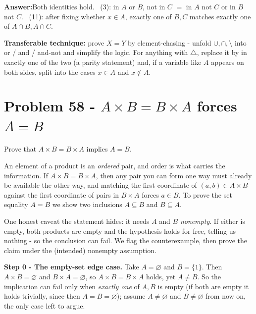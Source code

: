 \documentclass[11pt,a4paper]{article}
\newcommand{\symd}{\triangle}          %
\newcommand{\answer}[1]{\begin{answerbox}\centering\textbf{Answer:}\quad #1\end{answerbox}}
\begin{document}
\answer{Both identities hold. \ (3): \textquotedbl{}in $A$ or $B$, not in $C$\textquotedbl{} $=$
\textquotedbl{}in $A$ not $C$\textquotedbl{} or \textquotedbl{}in $B$ not $C$\textquotedbl{}.
\ (11): after fixing whether $x\in A$, \textquotedbl{}exactly one of $B,C$\textquotedbl{} matches
\textquotedbl{}exactly one of $A\cap B,A\cap C$\textquotedbl{}.}

\begin{methodbox}
\textbf{Transferable technique:} prove $X=Y$ by element-chasing - unfold $\cup,\cap,\setminus$ into
\textquotedbl{}or / and / and-not\textquotedbl{} and simplify the logic. For anything with
$\symd$, replace it by \textquotedbl{}in exactly one of the two\textquotedbl{} (a parity
statement) and, if a variable like $A$ appears on both sides, split into the cases $x\in A$ and
$x\notin A$.
\end{methodbox}

\section*{Problem 58 - $A\times B=B\times A$ forces $A=B$}

\begin{problembox}[58]
Prove that $A\times B=B\times A$ implies $A=B$.
\end{problembox}

\begin{ideabox}
An element of a product is an \emph{ordered} pair, and order is what carries the information. If
$A\times B=B\times A$, then any pair you can form one way must already be available the other way,
and matching the first coordinate of $(a,b)\in A\times B$ against the first coordinate of pairs in
$B\times A$ forces $a\in B$. To prove the set equality $A=B$ we show two inclusions $A\subseteq B$
and $B\subseteq A$.

One honest caveat the statement hides: it needs $A$ and $B$ \emph{nonempty}. If either is empty,
both products are empty and the hypothesis holds for free, telling us nothing - so the conclusion
can fail. We flag the counterexample, then prove the claim under the (intended) nonempty
assumption.
\end{ideabox}

\textbf{Step 0 - The empty-set edge case.}
Take $A=\varnothing$ and $B=\{1\}$. Then $A\times B=\varnothing$ and $B\times A=\varnothing$, so
$A\times B=B\times A$ holds, yet $A\neq B$. So the implication can fail only when \emph{exactly one}
of $A,B$ is empty (if both are empty it holds trivially, since then $A=B=\varnothing$); assume
$A\neq\varnothing$ and $B\neq\varnothing$ from now on, the only case left to argue.
\end{document}
